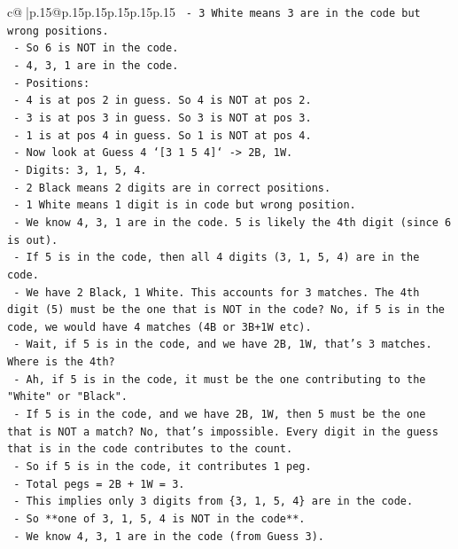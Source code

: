 \documentclass{article}
\begin{document}
{\begin{supertabular}{c@{$\;$}|p{.15\linewidth}@{}p{.15\linewidth}p{.15\linewidth}p{.15\linewidth}p{.15\linewidth}p{.15\linewidth}}
{{{\texttt{      {-} 3 White means 3 are in the code but wrong positions.} \\
\texttt{      {-} So 6 is NOT in the code.} \\
\texttt{      {-} 4, 3, 1 are in the code.} \\
\texttt{      {-} Positions:} \\
\texttt{        {-} 4 is at pos 2 in guess. So 4 is NOT at pos 2.} \\
\texttt{        {-} 3 is at pos 3 in guess. So 3 is NOT at pos 3.} \\
\texttt{        {-} 1 is at pos 4 in guess. So 1 is NOT at pos 4.} \\
\texttt{    {-} Now look at Guess 4 `{[}3 1 5 4{]}` {-}> 2B, 1W.} \\
\texttt{      {-} Digits: 3, 1, 5, 4.} \\
\texttt{      {-} 2 Black means 2 digits are in correct positions.} \\
\texttt{      {-} 1 White means 1 digit is in code but wrong position.} \\
\texttt{      {-} We know 4, 3, 1 are in the code. 5 is likely the 4th digit (since 6 is out).} \\
\texttt{      {-} If 5 is in the code, then all 4 digits (3, 1, 5, 4) are in the code.} \\
\texttt{      {-} We have 2 Black, 1 White. This accounts for 3 matches. The 4th digit (5) must be the one that is NOT in the code? No, if 5 is in the code, we would have 4 matches (4B or 3B+1W etc).} \\
\texttt{      {-} Wait, if 5 is in the code, and we have 2B, 1W, that's 3 matches. Where is the 4th?} \\
\texttt{      {-} Ah, if 5 is in the code, it must be the one contributing to the "White" or "Black".} \\
\texttt{      {-} If 5 is in the code, and we have 2B, 1W, then 5 must be the one that is NOT a match? No, that's impossible. Every digit in the guess that is in the code contributes to the count.} \\
\texttt{      {-} So if 5 is in the code, it contributes 1 peg.} \\
\texttt{      {-} Total pegs = 2B + 1W = 3.} \\
\texttt{      {-} This implies only 3 digits from \{3, 1, 5, 4\} are in the code.} \\
\texttt{      {-} So **one of 3, 1, 5, 4 is NOT in the code**.} \\
\texttt{      {-} We know 4, 3, 1 are in the code (from Guess 3).} \\
}}}
\end{supertabular}}
\end{document}
